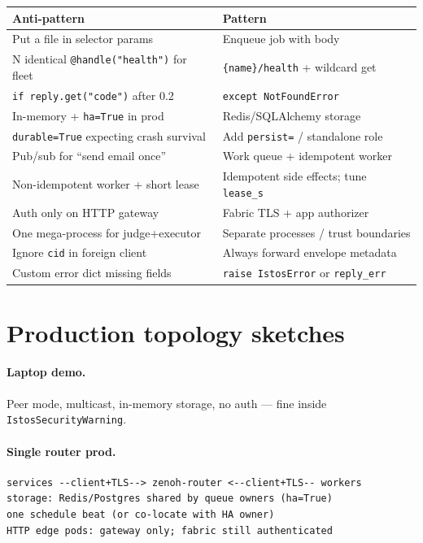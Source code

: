 \documentclass[11pt,a4paper]{article}
\begin{document}
\begin{center}
\begin{tabularx}{\textwidth}{@{}X X@{}}
\toprule
\textbf{Anti-pattern} & \textbf{Pattern} \\
\midrule
Put a file in selector params & Enqueue job with body \\
N identical \texttt{@handle("health")} for fleet & \texttt{\{name\}/health} + wildcard get \\
\texttt{if reply.get("code")} after 0.2 & \texttt{except NotFoundError} \\
In-memory + \texttt{ha=True} in prod & Redis/SQLAlchemy storage \\
\texttt{durable=True} expecting crash survival & Add \texttt{persist=} / standalone role \\
Pub/sub for ``send email once'' & Work queue + idempotent worker \\
Non-idempotent worker + short lease & Idempotent side effects; tune \texttt{lease\_s} \\
Auth only on HTTP gateway & Fabric TLS + app authorizer \\
One mega-process for judge+executor & Separate processes / trust boundaries \\
Ignore \texttt{cid} in foreign client & Always forward envelope metadata \\
Custom error dict missing fields & \texttt{raise IstosError} or \texttt{reply\_err} \\
\bottomrule
\end{tabularx}
\end{center}

\section{Production topology sketches}

\paragraph{Laptop demo.} Peer mode, multicast, in-memory storage, no auth --- fine
inside \texttt{IstosSecurityWarning}.

\paragraph{Single router prod.}
\begin{lstlisting}[language={}]
services --client+TLS--> zenoh-router <--client+TLS-- workers
storage: Redis/Postgres shared by queue owners (ha=True)
one schedule beat (or co-locate with HA owner)
HTTP edge pods: gateway only; fabric still authenticated
\end{lstlisting}
\end{document}
